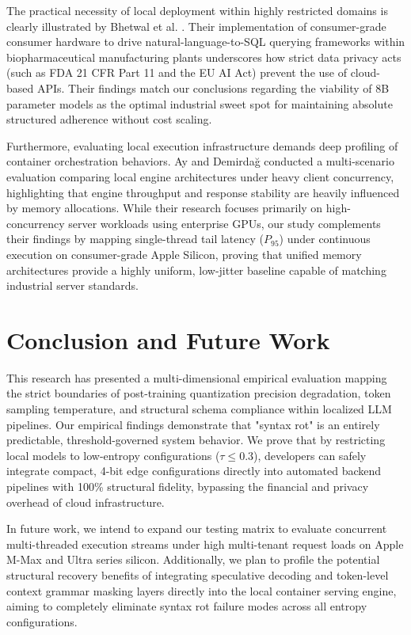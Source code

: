 \documentclass[11pt,journal,compsoc,onecolumn]{IEEEtran}
\begin{document}
The practical necessity of local deployment within highly restricted domains is clearly illustrated by Bhetwal et al. \cite{bhetwal2026}. Their implementation of consumer-grade consumer hardware to drive natural-language-to-SQL querying frameworks within biopharmaceutical manufacturing plants underscores how strict data privacy acts (such as FDA 21 CFR Part 11 and the EU AI Act) prevent the use of cloud-based APIs. Their findings match our conclusions regarding the viability of 8B parameter models as the optimal industrial sweet spot for maintaining absolute structured adherence without cost scaling.

Furthermore, evaluating local execution infrastructure demands deep profiling of container orchestration behaviors. Ay and Demirdağ \cite{ay2026} conducted a multi-scenario evaluation comparing local engine architectures under heavy client concurrency, highlighting that engine throughput and response stability are heavily influenced by memory allocations. While their research focuses primarily on high-concurrency server workloads using enterprise GPUs, our study complements their findings by mapping single-thread tail latency ($P_{95}$) under continuous execution on consumer-grade Apple Silicon, proving that unified memory architectures provide a highly uniform, low-jitter baseline capable of matching industrial server standards.

\section{Conclusion and Future Work}
\label{sec:conclusion}
This research has presented a multi-dimensional empirical evaluation mapping the strict boundaries of post-training quantization precision degradation, token sampling temperature, and structural schema compliance within localized LLM pipelines. Our empirical findings demonstrate that "syntax rot" is an entirely predictable, threshold-governed system behavior. We prove that by restricting local models to low-entropy configurations ($\tau \le 0.3$), developers can safely integrate compact, 4-bit edge configurations directly into automated backend pipelines with 100\% structural fidelity, bypassing the financial and privacy overhead of cloud infrastructure.

In future work, we intend to expand our testing matrix to evaluate concurrent multi-threaded execution streams under high multi-tenant request loads on Apple M-Max and Ultra series silicon. Additionally, we plan to profile the potential structural recovery benefits of integrating speculative decoding and token-level context grammar masking layers directly into the local container serving engine, aiming to completely eliminate syntax rot failure modes across all entropy configurations.
\end{document}
